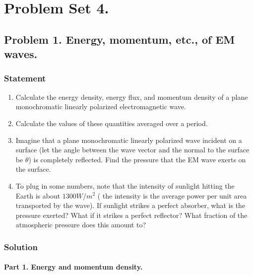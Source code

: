 %
%

\chapter{Problem Set 4.}
\label{chap:relElectroDynProblemSet4}
\date{Mar 3, 2011}

\beginArtWithToc


\section{Problem 1.  Energy, momentum, etc., of EM waves.}

\subsection{Statement}

\begin{enumerate}
\item Calculate the energy density, energy flux, and momentum density of a plane monochromatic linearly polarized electromagnetic wave.
\item Calculate the values of these quantities averaged over a period.
\item Imagine that a plane monochromatic linearly polarized wave incident on a surface (let the angle between the wave vector and the normal to the surface be $\theta$) is completely reflected.  Find the pressure that the EM wave exerts on the surface.
\item To plug in some numbers, note that the intensity of sunlight hitting the Earth is about $1300 W/m^2$ ( the intensity is the average power per unit area transported by the wave).  If sunlight strikes a perfect absorber, what is the pressure exerted?  What if it strikes a perfect reflector?  What fraction of the atmospheric pressure does this amount to?
\end{enumerate}
\subsection{Solution}
\subsubsection{Part 1.  Energy and momentum density.}

